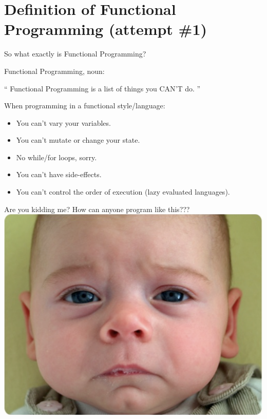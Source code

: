 \documentclass{beamer}
\begin{document}
\section{Definition of Functional Programming (attempt \#1)}

\begin{frame}{}
  So what exactly is Functional Programming?
\end{frame}

\begin{frame}{Functional Programming, noun:}

  \begin{exampleblock}{}
    {\Huge ``
      Functional Programming is a list of things you CAN’T do.
      ''}
    \vskip5mm
    \hspace*{}
  \end{exampleblock}
\end{frame}

\begin{frame}
  When programming in a functional style/language:
  \begin{itemize}[<+->]
  \item You can't vary your variables.
  \item You can't mutate or change your state.
  \item No while/for loops, sorry.
  \item You can't have side-effects.
  \item You can't control the order of execution (lazy evaluated languages).
  \end{itemize}
\end{frame}

\begin{frame}{Are you kidding me?}
  How can anyone program like this???
  \includegraphics[scale=0.3]{img/sadbaby.png}
\end{frame}
\end{document}
